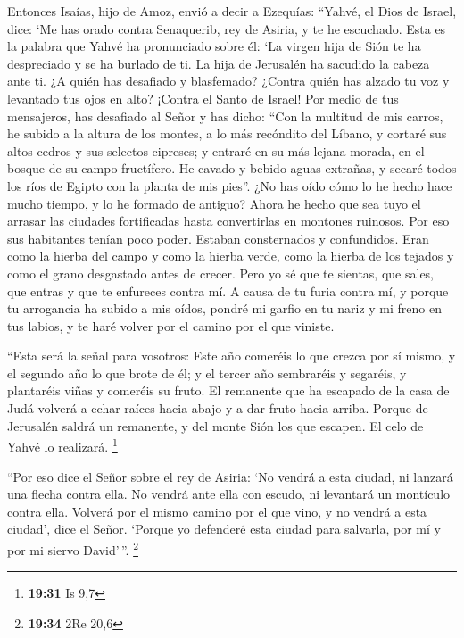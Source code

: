 \begin{paracol}{2}
 Entonces Isaías, hijo de Amoz, envió a decir a Ezequías:
``Yahvé, el Dios de Israel, dice: `Me has orado contra Senaquerib, rey
de Asiria, y te he escuchado.  Esta es la palabra que
Yahvé ha pronunciado sobre él: `La virgen hija de Sión te ha despreciado
y se ha burlado de ti. La hija de Jerusalén ha sacudido la cabeza ante
ti.  ¿A quién has desafiado y blasfemado? ¿Contra quién
has alzado tu voz y levantado tus ojos en alto? ¡Contra el Santo de
Israel!  Por medio de tus mensajeros, has desafiado al
Señor y has dicho: ``Con la multitud de mis carros, he subido a la
altura de los montes, a lo más recóndito del Líbano, y cortaré sus altos
cedros y sus selectos cipreses; y entraré en su más lejana morada, en el
bosque de su campo fructífero.  He cavado y bebido aguas
extrañas, y secaré todos los ríos de Egipto con la planta de mis pies''.
 ¿No has oído cómo lo he hecho hace mucho tiempo, y lo he
formado de antiguo? Ahora he hecho que sea tuyo el arrasar las ciudades
fortificadas hasta convertirlas en montones ruinosos. 
Por eso sus habitantes tenían poco poder. Estaban consternados y
confundidos. Eran como la hierba del campo y como la hierba verde, como
la hierba de los tejados y como el grano desgastado antes de crecer.
 Pero yo sé que te sientas, que sales, que entras y que
te enfureces contra mí.  A causa de tu furia contra mí, y
porque tu arrogancia ha subido a mis oídos, pondré mi garfio en tu nariz
y mi freno en tus labios, y te haré volver por el camino por el que
viniste.

 ``Esta será la señal para vosotros: Este año comeréis lo
que crezca por sí mismo, y el segundo año lo que brote de él; y el
tercer año sembraréis y segaréis, y plantaréis viñas y comeréis su
fruto.  El remanente que ha escapado de la casa de Judá
volverá a echar raíces hacia abajo y a dar fruto hacia arriba.
 Porque de Jerusalén saldrá un remanente, y del monte
Sión los que escapen. El celo de Yahvé lo realizará. \footnote{\textbf{19:31}
  Is 9,7}

 ``Por eso dice el Señor sobre el rey de Asiria: `No
vendrá a esta ciudad, ni lanzará una flecha contra ella. No vendrá ante
ella con escudo, ni levantará un montículo contra ella. 
Volverá por el mismo camino por el que vino, y no vendrá a esta ciudad',
dice el Señor.  `Porque yo defenderé esta ciudad para
salvarla, por mí y por mi siervo David'\,''. \footnote{\textbf{19:34}
  2Re 20,6}


\end{paracol}
